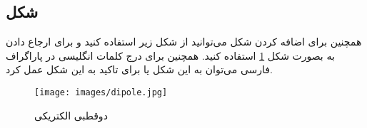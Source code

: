 \subsection{شکل}
\par
همچنین برای اضافه کردن شکل می‌توانید از شکل زیر استفاده کنید و برای ارجاع دادن به بصورت شکل  
 \ref{fig:dynamicprogramming}
 استفاده کنید.
 همچنین برای درج کلمات انگلیسی در پاراگراف فارسی می‌توان به این شکل
 یا برای تاکید به این شکل
 عمل کرد.
\begin{figure}[h!]
    \centering
    \texttt{[image: images/dipole.jpg]}
    \caption{دوقطبی الکتریکی}
    \label{fig:dynamicprogramming}
\end{figure}\\
